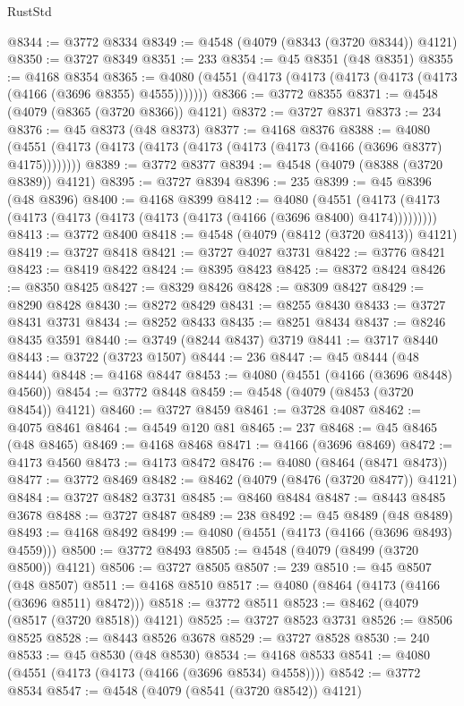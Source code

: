 \begin{lexlean}{RustStd}
\begin{coremodule}
@8344 := @3772 @8334
@8349 := @4548 (@4079 (@8343 (@3720 @8344)) @4121)
@8350 := @3727 @8349
@8351 := 233
@8354 := @45 @8351 (@48 @8351)
@8355 := @4168 @8354
@8365 := @4080 (@4551 (@4173 (@4173 (@4173 (@4173 (@4173 (@4166 (@3696 @8355) @4555)))))))
@8366 := @3772 @8355
@8371 := @4548 (@4079 (@8365 (@3720 @8366)) @4121)
@8372 := @3727 @8371
@8373 := 234
@8376 := @45 @8373 (@48 @8373)
@8377 := @4168 @8376
@8388 := @4080 (@4551 (@4173 (@4173 (@4173 (@4173 (@4173 (@4173 (@4166 (@3696 @8377) @4175))))))))
@8389 := @3772 @8377
@8394 := @4548 (@4079 (@8388 (@3720 @8389)) @4121)
@8395 := @3727 @8394
@8396 := 235
@8399 := @45 @8396 (@48 @8396)
@8400 := @4168 @8399
@8412 := @4080
    (@4551 (@4173 (@4173 (@4173 (@4173 (@4173 (@4173 (@4173 (@4166 (@3696 @8400) @4174)))))))))
@8413 := @3772 @8400
@8418 := @4548 (@4079 (@8412 (@3720 @8413)) @4121)
@8419 := @3727 @8418
@8421 := @3727 @4027 @3731
@8422 := @3776 @8421
@8423 := @8419 @8422
@8424 := @8395 @8423
@8425 := @8372 @8424
@8426 := @8350 @8425
@8427 := @8329 @8426
@8428 := @8309 @8427
@8429 := @8290 @8428
@8430 := @8272 @8429
@8431 := @8255 @8430
@8433 := @3727 @8431 @3731
@8434 := @8252 @8433
@8435 := @8251 @8434
@8437 := @8246 @8435 @3591
@8440 := @3749 (@8244 @8437) @3719
@8441 := @3717 @8440
@8443 := @3722 (@3723 @1507)
@8444 := 236
@8447 := @45 @8444 (@48 @8444)
@8448 := @4168 @8447
@8453 := @4080 (@4551 (@4166 (@3696 @8448) @4560))
@8454 := @3772 @8448
@8459 := @4548 (@4079 (@8453 (@3720 @8454)) @4121)
@8460 := @3727 @8459
@8461 := @3728 @4087
@8462 := @4075 @8461
@8464 := @4549 @120 @81
@8465 := 237
@8468 := @45 @8465 (@48 @8465)
@8469 := @4168 @8468
@8471 := @4166 (@3696 @8469)
@8472 := @4173 @4560
@8473 := @4173 @8472
@8476 := @4080 (@8464 (@8471 @8473))
@8477 := @3772 @8469
@8482 := @8462 (@4079 (@8476 (@3720 @8477)) @4121)
@8484 := @3727 @8482 @3731
@8485 := @8460 @8484
@8487 := @8443 @8485 @3678
@8488 := @3727 @8487
@8489 := 238
@8492 := @45 @8489 (@48 @8489)
@8493 := @4168 @8492
@8499 := @4080 (@4551 (@4173 (@4166 (@3696 @8493) @4559)))
@8500 := @3772 @8493
@8505 := @4548 (@4079 (@8499 (@3720 @8500)) @4121)
@8506 := @3727 @8505
@8507 := 239
@8510 := @45 @8507 (@48 @8507)
@8511 := @4168 @8510
@8517 := @4080 (@8464 (@4173 (@4166 (@3696 @8511) @8472)))
@8518 := @3772 @8511
@8523 := @8462 (@4079 (@8517 (@3720 @8518)) @4121)
@8525 := @3727 @8523 @3731
@8526 := @8506 @8525
@8528 := @8443 @8526 @3678
@8529 := @3727 @8528
@8530 := 240
@8533 := @45 @8530 (@48 @8530)
@8534 := @4168 @8533
@8541 := @4080 (@4551 (@4173 (@4173 (@4166 (@3696 @8534) @4558))))
@8542 := @3772 @8534
@8547 := @4548 (@4079 (@8541 (@3720 @8542)) @4121)

\end{coremodule}
\end{lexlean}

